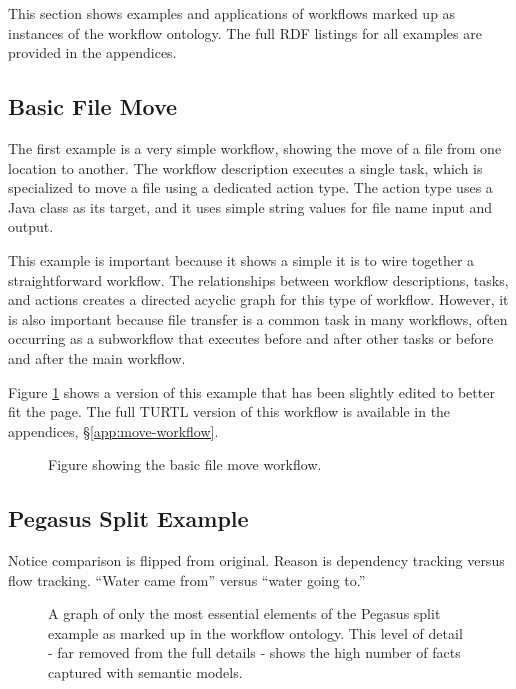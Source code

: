 This section shows examples and applications of workflows marked up as
instances of the workflow ontology. The full RDF listings for all
examples are provided in the appendices.

\subsection{Basic File Move}

The first example is a very simple workflow, showing the move of a file from
one location to another. The workflow description executes a single task, which
is specialized to move a file using a dedicated action type. The action type
uses a Java class as its target, and it uses simple string values for file name
input and output.

This example is important because it shows a simple it is to wire together a
straightforward workflow. The relationships between workflow descriptions,
tasks, and actions creates a directed acyclic graph for this type of workflow.
However, it is also important because file transfer is a common task in many
workflows, often occurring as a subworkflow that executes before and after
other tasks or before and after the main workflow.

Figure \ref{move-workflows} shows a version of this example that has been
slightly edited to better fit the page. The full TURTL version of this workflow
is available in the appendices, \S \ref{app:move-workflow}.

\begin{figure}[htbp]
\centering
{}
\caption{Figure showing the basic file move workflow.}
\label{move-workflows}
\end{figure}

\subsection{Pegasus Split Example}

Notice comparison is flipped from original. Reason is dependency tracking versus
flow tracking. ``Water came from'' versus ``water going to.''

\begin{figure}[htbp]
\centering
{}
\caption{A graph of only the most essential elements of the Pegasus split
example as marked up in the workflow ontology. This level of detail - far
removed from the full details - shows the high number of facts captured with
semantic models.}
\label{pegasus-split-workflow}
\end{figure}

